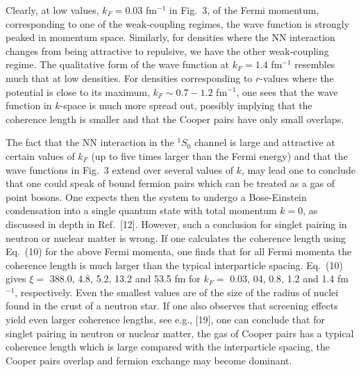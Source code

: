 Clearly, at low values, $k_F=0.03$ fm$^{-1}$ in Fig.\ 3, 
of the Fermi momentum, corresponding  
to one of the weak-coupling regimes, the wave function is
strongly peaked in momentum space. Similarly, for densities where the 
NN interaction changes from being attractive to repulsive, we have the other
weak-coupling regime. The qualitative form of the wave function
at $k_F=1.4$ fm$^{-1}$ resembles much that at low densities. 
For densities corresponding to $r$-values where the potential is close
to its maximum, $k_F\sim 0.7-1.2$ fm$^{-1}$, one sees that the wave function
in $k$-space is much more spread out, possibly implying that the coherence length is
smaller and that the Cooper pairs have only small overlaps.

The fact that the NN interaction in the  $^1S_0$ channel is large and
attractive at certain values of $k_F$ (up to five times larger than the
Fermi energy) and that the wave functions in Fig.\ 3 extend over several values
of $k$, may lead one to conclude that one could speak of 
bound fermion pairs which 
can be treated as a gas of point bosons. One expects then the system
to undergo a Bose-Einstein condensation into a single quantum
state with total momentum $k=0$, as discussed in depth in Ref.\ [12].
However, such a conclusion for singlet pairing in neutron or nuclear
matter is wrong. If one calculates the coherence length using Eq.\ (10)
for the above Fermi momenta, one finds that for all Fermi momenta
the coherence length is much larger than the typical interparticle
spacing. Eq.\ (10) gives 
$\xi=$ 388.0, 4.8, 5.2, 13.2 and 53.5 fm for
$k_F=$ 0.03, 04, 0.8, 1.2 and 1.4 fm$^{-1}$, respectively. Even the smallest
values are of the size of the radius of nuclei found in the crust
of a neutron star. 
If one also observes that screening effects yield even larger
coherence lengths, see e.g., [19], one can conclude that for
singlet pairing in neutron or nuclear matter,  
the gas of Cooper pairs has  
a typical coherence length which is large compared with the interparticle
spacing, the Cooper pairs overlap and fermion exchange may become dominant.
 
